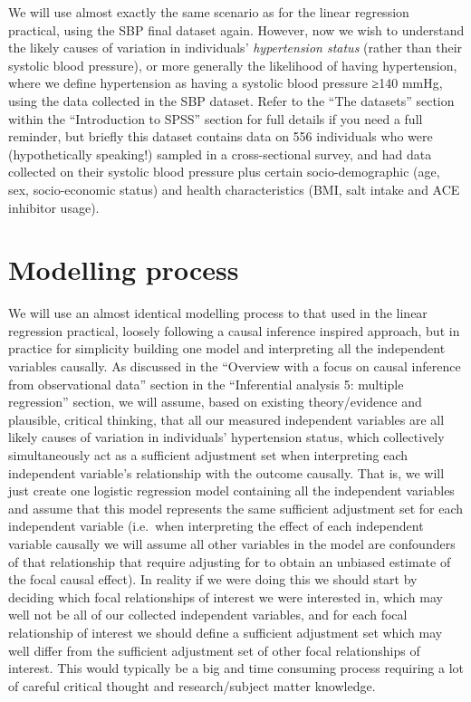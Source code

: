 \documentclass[
]{book}
\begin{document}
We will use almost exactly the same scenario as for the linear regression practical, using the SBP final dataset again. However, now we wish to understand the likely causes of variation in individuals' \emph{hypertension status} (rather than their systolic blood pressure), or more generally the likelihood of having hypertension, where we define hypertension as having a systolic blood pressure ≥140 mmHg, using the data collected in the SBP dataset. Refer to the ``The datasets'' section within the ``Introduction to SPSS'' section for full details if you need a full reminder, but briefly this dataset contains data on 556 individuals who were (hypothetically speaking!) sampled in a cross-sectional survey, and had data collected on their systolic blood pressure plus certain socio-demographic (age, sex, socio-economic status) and health characteristics (BMI, salt intake and ACE inhibitor usage).

\hypertarget{modelling-process}{%
\section{Modelling process}\label{modelling-process}}

We will use an almost identical modelling process to that used in the linear regression practical, loosely following a causal inference inspired approach, but in practice for simplicity building one model and interpreting all the independent variables causally. As discussed in the ``Overview with a focus on causal inference from observational data'' section in the ``Inferential analysis 5: multiple regression'' section, we will assume, based on existing theory/evidence and plausible, critical thinking, that all our measured independent variables are all likely causes of variation in individuals' hypertension status, which collectively simultaneously act as a sufficient adjustment set when interpreting each independent variable's relationship with the outcome causally. That is, we will just create one logistic regression model containing all the independent variables and assume that this model represents the same sufficient adjustment set for each independent variable (i.e.~when interpreting the effect of each independent variable causally we will assume all other variables in the model are confounders of that relationship that require adjusting for to obtain an unbiased estimate of the focal causal effect). In reality if we were doing this we should start by deciding which focal relationships of interest we were interested in, which may well not be all of our collected independent variables, and for each focal relationship of interest we should define a sufficient adjustment set which may well differ from the sufficient adjustment set of other focal relationships of interest. This would typically be a big and time consuming process requiring a lot of careful critical thought and research/subject matter knowledge.
\end{document}
